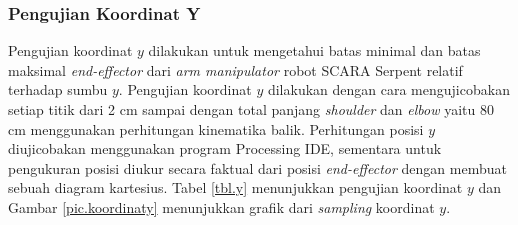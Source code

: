 \subsubsection{Pengujian Koordinat Y}
\fontsize{12}{15}\selectfont
Pengujian koordinat $y$ dilakukan untuk mengetahui batas minimal dan batas maksimal \textit{end-effector} dari \textit{arm manipulator} robot SCARA Serpent relatif terhadap sumbu $y$. Pengujian koordinat $y$ dilakukan dengan cara mengujicobakan setiap titik dari 2 cm sampai dengan total panjang \textit{shoulder} dan \textit{elbow} yaitu 80 cm menggunakan perhitungan kinematika balik. Perhitungan posisi $y$ diujicobakan menggunakan program Processing IDE, sementara untuk pengukuran posisi diukur secara faktual dari posisi \textit{end-effector} dengan membuat sebuah diagram kartesius. Tabel \ref{tbl.y} menunjukkan pengujian koordinat $y$ dan Gambar \ref{pic.koordinaty} menunjukkan grafik dari \textit{sampling} koordinat $y$.
\fontsize{8}{10}\selectfont
